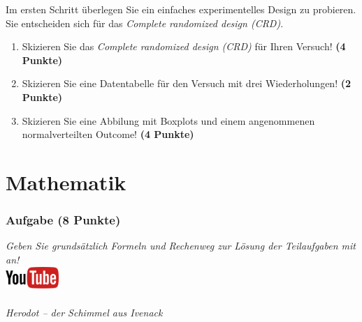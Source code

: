 \documentclass[a4paper, 9pt]{scrartcl}\usepackage[]{graphicx}\usepackage[]{xcolor}
\begin{document}
Im ersten Schritt {\"u}berlegen Sie ein einfaches experimentelles Design zu
probieren. Sie entscheiden sich f{\"u}r das \textit{Complete randomized design (CRD)}.

\begin{enumerate}
  \setcounter{enumi}{0}
\item Skizieren Sie das \textit{Complete randomized design (CRD)} f{\"u}r Ihren Versuch!
  \textbf{(4 Punkte)}
\item Skizieren Sie eine Datentabelle f{\"u}r den Versuch mit drei
  Wiederholungen! \textbf{(2 Punkte)}
\item Skizieren Sie eine Abbilung mit Boxplots und einem angenommenen
  normalverteilten Outcome! \textbf{(4 Punkte)}
\end{enumerate}


 
\clearpage
\part{Mathematik}

\section{Aufgabe \hfill (8 Punkte)}

\textit{Geben Sie grunds{\"a}tzlich Formeln und Rechenweg zur L{\"o}sung der
  Teilaufgaben mit an!} \\[1Ex]

\hfill\href{https://youtu.be/Fu8kN0Uj13Y}{\includegraphics[width =
  2cm]{img/youtube}} %
\hspace{2Ex}

\paragraph{Herodot – der Schimmel aus Ivenack}
\end{document}
